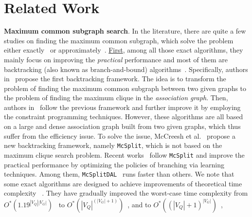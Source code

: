 \section{Related Work}
\label{sec:related}

\noindent\textbf{Maximum common subgraph search}. In the literature, there are quite a few studies on finding the maximum common subgraph, which solve the problem either exactly~\cite{levi1973note,mcgregor1982backtrack,abu2014maximum,krissinel2004common,suters2005new,mccreesh2016clique,vismara2008finding,zhoustrengthened,liu2020learning,liu2023hybrid,mccreesh2017partitioning} or approximately~\cite{choi2012efficient,rutgers2010approximate,xiao2009generative,zanfir2018deep,bai2021glsearch}. \underline{First}, among all those exact algorithms, they mainly focus on improving the \emph{practical} performance and most of them are backtracking (also known as branch-and-bound) algorithms~\cite{levi1973note,mcgregor1982backtrack}. Specifically, authors in~\cite{levi1973note,mcgregor1982backtrack} propose the first backtracking framework. The idea is to transform the problem of finding the maximum common subgraph between two given graphs to the problem of finding the maximum clique in the \emph{association graph}. Then, authors in~\cite{mccreesh2016clique,vismara2008finding} follow the previous framework and further improve it by employing the constraint programming techniques. However, these algorithms are all based on a large and dense association graph built from two given graphs, which thus suffer from the efficiency issue. To solve the issue, McCreesh et al.~\cite{mccreesh2017partitioning} propose a new backtracking framework, namely \texttt{McSplit}, which is not based on the maximum clique search problem. Recent works~\cite{zhoustrengthened,liu2020learning,liu2023hybrid} follow \texttt{McSplit} and improve the practical performance by optimizing the policies of branching via learning techniques. Among them, \texttt{McSplitDAL}~\cite{liu2023hybrid} runs faster than {\cheng others.}
We note that some exact algorithms are designed 
{\chengB to achieve improvements of theoretical time complexity}
~\cite{abu2014maximum,levi1973note,krissinel2004common,suters2005new}. They have gradually improved the worst-case time complexity from $O^*(1.19^{|V_Q||V_G|})$~\cite{levi1973note} to $O^*(|V_Q|^{(|V_G|+1)})$~\cite{krissinel2004common}, and {\cheng to} $O^*((|V_Q|+1)^{|V_G|})$~\cite{suters2005new},
